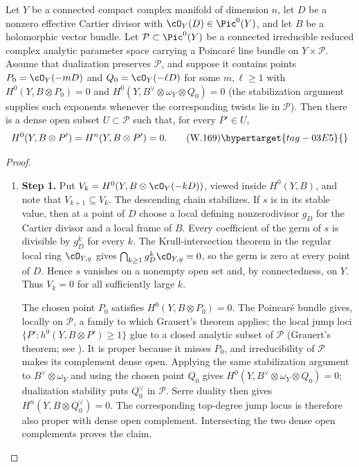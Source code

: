 \begin{lemma}
\hypertarget{tag-03IA}{}\label{wbII:lem:generic-endpoints}

Let $Y$ be a connected compact complex manifold of dimension $n$, let $D$ be
a nonzero effective Cartier divisor with $\cO_Y(D)\in\Pic^0(Y)$, and let
$B$ be a holomorphic vector bundle.  Let $\mathcal P\subset\Pic^0(Y)$ be a
connected irreducible reduced complex analytic parameter space carrying a
Poincar\'e line bundle on $Y\times\mathcal P$.  Assume that dualization
preserves $\mathcal P$, and suppose it
  contains points $P_0=\cO_Y(-mD)$ and $Q_0=\cO_Y(-\ell D)$ for some
  $m,\ell\ge1$ with
  $H^0(Y,B\otimes P_0)=0$ and
  $H^0(Y,B^\vee\otimes\omega_Y\otimes Q_0)=0$ (the stabilization argument
  supplies such exponents whenever the corresponding twists lie in
  $\mathcal P$).  Then there is a dense open subset
$U\subset\mathcal P$ such that, for every $P'\in U$,
\[
 H^0(Y,B\otimes P')=H^n(Y,B\otimes P')=0.
 \tag{W.169}\hypertarget{tag-03E5}{}\label{wbII:eq:CN:5.2}
\]
\end{lemma}



\begin{proof}
\begin{enumerate}[label={$\langle1\rangle$\arabic*.},leftmargin=*]
\item 
\noindent\textbf{Step 1.} Put
  \(V_k=H^0(Y,B\otimes\cO_Y(-kD))\), viewed inside $H^0(Y,B)$, and note
  that $V_{k+1}\subseteq V_k$.  The descending chain stabilizes.  If $s$ is
  in its stable value, then at a point of $D$ choose a local defining
  nonzerodivisor $g_D$ for the Cartier divisor and a local frame of $B$.
  Every coefficient of the germ of $s$ is divisible by $g_D^k$ for every
  $k$.  The Krull-intersection theorem in the regular local ring
  $\cO_{Y,y}$ gives $\bigcap_{k\ge1}g_D^k\cO_{Y,y}=0$, so the germ is zero at
  every point of $D$.  Hence $s$ vanishes on a nonempty open set and, by
  connectedness, on $Y$.  Thus $V_k=0$ for all sufficiently large $k$.

  The chosen point $P_0$ satisfies
  $H^0(Y,B\otimes P_0)=0$.  The Poincar\'e bundle gives, locally on
$\mathcal P$, a family to which Grauert's theorem applies; the local jump
  loci $\{P':h^0(Y,B\otimes P')\ge1\}$ glue to a closed analytic subset of
  $\mathcal P$ (Grauert's theorem; see \cite{Grauert1960D,BS76push}).  It is proper because it misses $P_0$, and irreducibility of
$\mathcal P$ makes its complement dense open.  Applying the same stabilization
argument to $B^\vee\otimes\omega_Y$ and using the chosen point $Q_0$ gives
$H^0(Y,B^\vee\otimes\omega_Y\otimes Q_0)=0$; dualization stability puts
$Q_0^\vee$ in $\mathcal P$.  Serre duality then gives
$H^n(Y,B\otimes Q_0^\vee)=0$.  The corresponding top-degree jump locus is
therefore also proper with dense open complement.  Intersecting the two
dense open complements proves the claim.

\end{enumerate}
\end{proof}